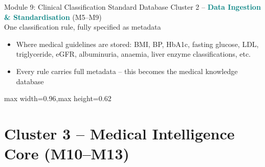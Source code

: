 \documentclass[9pt,aspectratio=169]{beamer}
\begin{document}
\begin{frame}[t]{Module 9: Clinical Classification Standard Database}
\textcolor{black!55}{\scriptsize Cluster 2 -- \textcolor{teal}{\textbf{Data Ingestion \& Standardisation}} (M5--M9) \\ One classification rule, fully specified as metadata}\\[2pt]
\begin{itemize}
\scriptsize
\item Where medical guidelines are stored: BMI, BP, HbA1c, fasting glucose, LDL, triglyceride, eGFR, albuminuria, anaemia, liver enzyme classifications, etc.
\item Every rule carries full metadata -- this becomes the medical knowledge database
\end{itemize}
\vspace{4pt}
\begin{center}
\begin{adjustbox}{max width=0.96\linewidth,max height=0.62\textheight}
\end{adjustbox}
\end{center}
\end{frame}

\section{Cluster 3 -- Medical Intelligence Core (M10--M13)}
\end{document}
